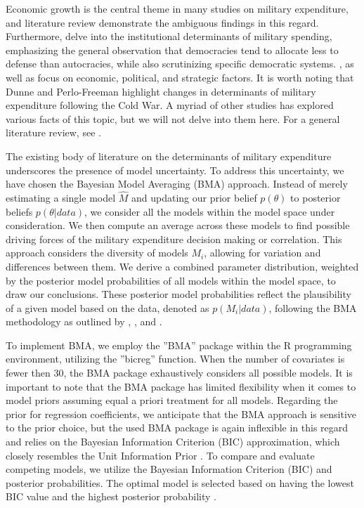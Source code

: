 \documentclass[12pt,a4paper]{article}
\begin{document}
Economic growth is the central theme in many studies on military expenditure, and \citet{lin2019} literature review demonstrate the ambiguous findings in this regard. Furthermore, \citet{albalate2012} delve into the institutional determinants of military spending, emphasizing the general observation that democracies tend to allocate less to defense than autocracies, while also scrutinizing specific democratic systems. \citet{dunne2003a,dunne2003b}, as well as \citet{nikolaidou2008} focus on economic, political, and strategic factors. It is worth noting that Dunne and Perlo-Freeman highlight changes in determinants of military expenditure following the Cold War. A myriad of other studies has explored various facts of this topic, but we will not delve into them here. For a general literature review, see \citet{albalate2012}. 

The existing body of literature on the determinants of military expenditure underscores the presence of model uncertainty. To address this uncertainty, we have chosen the Bayesian Model Averaging (BMA) approach. Instead of merely estimating a single model $\hat{M}$ and updating our prior belief $p(\theta)$ to posterior beliefs $p(\theta \vert data)$, we consider all the models within the model space under consideration. We then compute an average across these models to find possible driving forces of the military expenditure decision making or correlation. This approach considers the diversity of models $M_{i}$, allowing for variation and differences between them. We derive a combined parameter distribution, weighted by the posterior model probabilities of all models within the model space, to draw our conclusions. These posterior model probabilities reflect the plausibility of a given model based on the data, denoted as $p(M_{i}\vert data)$, following the BMA methodology as outlined by \citet{steel2020}, \citet{brown2002},  \citet{hoeting1999} and \citet{moral2015}.

To implement BMA, we employ the ''BMA'' package within the R programming environment, utilizing the ''bicreg'' function. When the number of covariates is fewer then 30, the BMA package exhaustively considers all possible models. It is important to note that the BMA package has limited flexibility when it comes to model priors assuming equal a priori treatment for all models. Regarding the prior for regression coefficients, we anticipate that the BMA approach is sensitive to the prior choice, but the used BMA package is again inflexible in this regard and relies on the Bayesian Information Criterion (BIC) approximation, which closely resembles the Unit Information Prior \citep{amini2012}. To compare and evaluate competing models, we utilize the Bayesian Information Criterion (BIC) and posterior probabilities. The optimal model is selected based on having the lowest BIC value and the highest posterior probability \citep{starkweather2011}.
\end{document}
